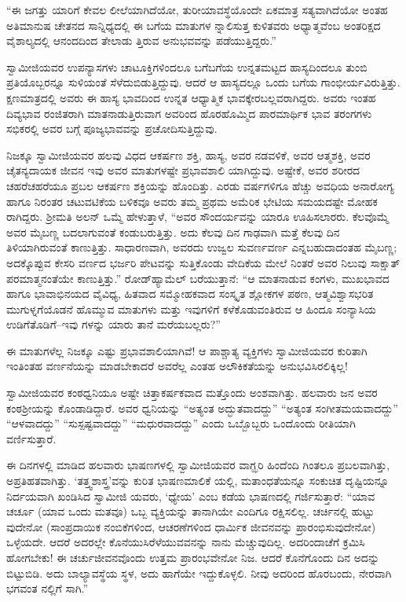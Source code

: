 “ಈ ಜಗತ್ತು ಯಾರಿಗೆ ಕೇವಲ ಲೀಲೆಯಾಗಿದೆಯೋ, ತುರೀಯಾವಸ್ಥೆಯೊಂದೇ ಏಕಮಾತ್ರ ಸತ್ಯವಾಗಿದೆಯೋ ಅಂತಹ ಅತಿಮಾನುಷ ಚೇತನದ ಸಾನ್ನಿಧ್ಯದಲ್ಲಿ ಈ ಬಗೆಯ ಮಾತುಗಳ ನ್ನಾಲಿಸುತ್ತ ಕುಳಿತವರು ಅಧ್ಯಾತ್ಮವೆಂಬ ಅಂತರಿಕ್ಷದ ವೈಶಾಲ್ಯದಲ್ಲಿ ಆನಂದದಿಂದ ತೇಲಾಡು ತ್ತಿರುವ ಅನುಭವವನ್ನು ಪಡೆಯುತ್ತಿದ್ದರು.”

ಸ್ವಾಮೀಜಿಯವರ ಉಪನ್ಯಾಸಗಳು ಚಾಟೂಕ್ತಿಗಳಿಂದಲೂ ಬಗೆಬಗೆಯ ಉನ್ನತಮಟ್ಟದ ಹಾಸ್ಯದಿಂದಲೂ ತುಂಬಿ ಪ್ರತಿಯೊಬ್ಬರನ್ನೂ ಸುಳಿಯಂತೆ ಸೆಳೆದುಬಿಡುತ್ತಿದ್ದುವು. ಆದರೆ ಆ ಹಾಸ್ಯದಲ್ಲೂ ಒಂದು ಬಗೆಯ ಗಾಂಭೀರ್ಯವಿರುತ್ತಿತ್ತು. ಕ್ಷಣಮಾತ್ರದಲ್ಲಿ ಅವರು ಈ ಹಾಸ್ಯ ಭಾವದಿಂದ ಉನ್ನತ ಆಧ್ಯಾತ್ಮಿಕ ಭಾವಕ್ಕೇರಬಲ್ಲವರಾಗಿದ್ದರು. ಅವರು ಇಂತಹ ದಿವ್ಯಭಾವ ರಂಜಿತರಾಗಿ ಮಾತನಾಡುತ್ತಿರುವಾಗ ಅವರಿಂದ ಹೊರಹೊಮ್ಮಿದ ಪಾರಮಾರ್ಥಿಕ ಭಾವ ತರಂಗಗಳು ಸಭಿಕರಲ್ಲಿ ಅವರ ಬಗ್ಗೆ ಪೂಜ್ಯಭಾವವನ್ನು ಪ್ರಚೋದಿಸುತ್ತಿದ್ದುವು.

ನಿಜಕ್ಕೂ ಸ್ವಾಮೀಜಿಯವರ ಹಲವು ವಿಧದ ಆಕರ್ಷಣ ಶಕ್ತಿ, ಹಾಸ್ಯ, ಅವರ ನಡವಳಿಕೆ, ಅವರ ಆತ್ಮಶಕ್ತಿ, ಅವರ ಚೈತನ್ಯದಾಯಕ ಜೀವನ ಇವು ಅವರ ಮಾತುಗಳಷ್ಟೇ ಪ್ರಭಾವಶಾಲಿ ಯಾಗಿದ್ದುವು. ಅಷ್ಟೇಕೆ, ಅವರ ಶರೀರದ ಚಹರೆಚಹರೆಯೂ ಪ್ರಬಲ ಆಕರ್ಷಣ ಶಕ್ತಿಯನ್ನು ಹೊಂದಿತ್ತು. ಎರಡು ವರ್ಷಗಳಿಗೂ ಹೆಚ್ಚು ಅವಧಿಯ ಅನಾರೋಗ್ಯ ಹಾಗೂ ನಿರಂತರ ಚಟುವಟಿಕೆಯ ಬಳಿಕವೂ ಅವರು ತಮ್ಮ ಪ್ರಥಮ ಅಮೆರಿಕ ಭೇಟಿಯ ಸಮಯದಷ್ಟೇ ಮೋಹಕ ರಾಗಿದ್ದರು. ಶ್ರೀಮತಿ ಅಲನ್ ಒಮ್ಮೆ ಹೇಳುತ್ತಾಳೆ, “ಅವರ ಸೌಂದರ್ಯವನ್ನು ಯಾರೂ ಊಹಿಸಲಾರರು. ಕೆಲವೊಮ್ಮೆ ಅವರ ಮೈಬಣ್ಣ ಬದಲಾಗುವಂತೆ ಕಂಡುಬರುತ್ತಿತ್ತು. ಅದು ಕೆಲವು ದಿನ ಗಾಢವಾಗಿ ಮತ್ತೆ ಕೆಲವು ದಿನ ತಿಳಿಯಾಗಿರುವಂತೆ ಕಾಣುತ್ತಿತ್ತು. ಸಾಧಾರಣವಾಗಿ, ಅವರದು ಉಜ್ವಲ ಸುವರ್ಣವರ್ಣ ಎನ್ನಬಹುದಾದಂತಹ ಮೈಬಣ್ಣ; ಅದಕ್ಕೊಪ್ಪುವ ಕೇಸರಿ ವರ್ಣದ ಭರ್ಜರಿ ಪೇಟವನ್ನು ಸುತ್ತಿಕೊಂಡು ವೇದಿಕೆಯ ಮೇಲೆ ನಿಂತರೆ ಅವರ ನಿಲುವು ಸಾಕ್ಷಾತ್ ಪರಮಾತ್ಮನಂತೆಯೇ ಕಾಣುತ್ತಿತ್ತು.” ರೋಡ್​ಹ್ಯಾಮೆಲ್ ಬರೆಯುತ್ತಾನೆ: “ಆ ಮಾತನಾಡುವ ಕಂಗಳು, ಮುಖಭಾವದ ಹಾಗೂ ಭಾವಾಭಿನಯದ ವೈವಿಧ್ಯ, ಹಿತವಾದ ಸಮ್ಮೋಹಕವಾದ ಸಂಸ್ಕೃತ ಶ್ಲೋಕಗಳ ಪಠಣ, ಆತ್ಮವಿಶ್ವಾಸಭರಿತ ಮುಗುಳ್ನಗೆಯೊಡನೆ ಹೊಮ್ಮುವ ಮಾತುಗಳು ಮತ್ತು ಇವುಗಳಿಗೆ ಕಳೆಕೊಡುವಂತಿರುವ ಆ ಹಿಂದೂ ಸಂನ್ಯಾಸಿಯ ಉಡಿಗೆತೊಡಿಗೆ–ಇವು ಗಳನ್ನು ಯಾರು ತಾನೆ ಮರೆಯಬಲ್ಲರು?”

ಈ ಮಾತುಗಳೆಲ್ಲ ನಿಜಕ್ಕೂ ಎಷ್ಟು ಪ್ರಭಾವಶಾಲಿಯಾಗಿವೆ! ಆ ಪಾಶ್ಚಾತ್ಯ ವ್ಯಕ್ತಿಗಳು ಸ್ವಾಮೀಜಿಯವರ ಕುರಿತಾಗಿ ಇಂತಿಂತಹ ವರ್ಣನೆಯನ್ನು ಮಾಡಬೇಕಾದರೆ ಅವರೆಲ್ಲ ಎಂತಹ ಅಲೌಕಿಕತೆಯನ್ನು ಅನುಭವಿಸಿರಲಿಕ್ಕಿಲ್ಲ!

ಸ್ವಾಮೀಜಿಯವರ ಕಂಠಧ್ವನಿಯೂ ಅಷ್ಟೇ ಚಿತ್ತಾಕರ್ಷಕವಾದ ಮತ್ತೊಂದು ಅಂಶವಾಗಿತ್ತು. ಹಲವಾರು ಜನ ಅವರ ಕಂಠಶ್ರೀಯನ್ನು ಕೊಂಡಾಡಿದ್ದಾರೆ. ಅವರ ಧ್ವನಿಯನ್ನು “ಅತ್ಯಂತ ಅದ್ಭುತವಾದದ್ದು” “ಅತ್ಯಂತ ಸಂಗೀತಮಯವಾದದ್ದು” “ಆಳವಾದದ್ದು” “ಸುಸ್ಪಷ್ಟವಾದದ್ದು” “ಮಧುರವಾದದ್ದು” ಎಂದು ಒಬ್ಬೊಬ್ಬರು ಒಂದೊಂದು ರೀತಿಯಾಗಿ ವರ್ಣಿಸುತ್ತಾರೆ.

ಈ ದಿನಗಳಲ್ಲಿ ಮಾಡಿದ ಹಲವಾರು ಭಾಷಣಗಳಲ್ಲಿ ಸ್ವಾಮೀಜಿಯವರ ವಾಗ್ಝರಿ ಹಿಂದೆಂದಿ ಗಿಂತಲೂ ಪ್ರಬಲವಾಗಿತ್ತು, ಅಪ್ರತಿಹತವಾಗಿತ್ತು. ‘ತತ್ತ್ವಶಾಸ್ತ್ರ’ವನ್ನು ಕುರಿತ ಭಾಷಣಮಾಲಿಕೆ ಯಲ್ಲಿ, ಮತಾಂಧತೆಯನ್ನೂ ಸಂಕುಚಿತ ದೃಷ್ಟಿಯನ್ನೂ ನಿರ್ದಯವಾಗಿ ಖಂಡಿಸಿದ ಸ್ವಾಮೀಜಿ ಯವರು, ‘ಧ್ಯೇಯ’ ಎಂಬ ಕಡೆಯ ಭಾಷಣದಲ್ಲಿ ಗರ್ಜಿಸುತ್ತಾರೆ: “ಯಾವ ಚರ್ಚೂ (ಯಾವ ಒಂದು ಮತವೂ) ಒಬ್ಬ ವ್ಯಕ್ತಿಯನ್ನು ತಾನಾಗಿಯೇ ಎಂದಿಗೂ ರಕ್ಷಿಸಲಿಲ್ಲ. ಚರ್ಚಿನಲ್ಲಿ ಹುಟ್ಟು ವುದೇನೋ (ಸಾಂಪ್ರದಾಯಿಕ ನಂಬಿಕೆಗಳಿಂದ, ಆಚರಣೆಗಳಿಂದ ಧಾರ್ಮಿಕ ಜೀವನವನ್ನು ಪ್ರಾರಂಭಿಸುವುದೇನೋ) ಒಳ್ಳೆಯದೇ. ಆದರೆ ಅದರಲ್ಲೇ ಕೊನೆಯುಸಿರೆಳೆಯುವವನನ್ನು ನಾನು ಮೆಚ್ಚುವುದಿಲ್ಲ. ಅದರಿಂದಾಚೆಗೆ ಕ್ರಮಿಸಿ ಹೋಗಬೇಕು! ಈ ಚರ್ಚುಜೀವನವೊಂದು ಉತ್ತಮ ಪ್ರಾರಂಭವೇನೋ ನಿಜ. ಆದರೆ ಕೊನೆಗೊಂದು ದಿನ ಅದನ್ನು ಬಿಟ್ಟುಬಿಡಿ. ಅದು ಬಾಲ್ಯಾವಸ್ಥೆಯ ಸ್ಥಳ, ಅದು ಹಾಗೆಯೇ ಇದ್ದುಕೊಳ್ಳಲಿ. ನೀವು ಅದರಿಂದ ಹೊರಬಂದು, ನೇರವಾಗಿ ಭಗವಂತ ನಲ್ಲಿಗೆ ಸಾಗಿ.”


